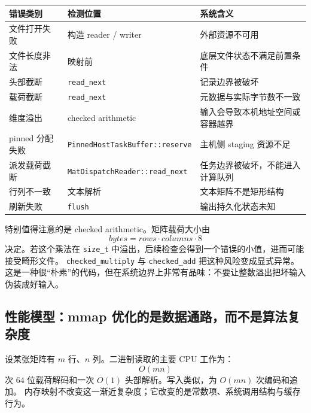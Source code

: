 \begin{table}[htbp]
    \centering
    \begin{tabular}{lll}
        \toprule
        错误类别        & 检测位置                                   & 系统含义             \\
        \midrule
        文件打开失败      & 构造 reader / writer                     & 外部资源不可用          \\
        文件长度非法      & 映射前                                    & 底层文件状态不满足前置条件    \\
        头部截断        & \texttt{read\_next}                    & 记录边界被破坏          \\
        载荷截断        & \texttt{read\_next}                    & 元数据与实际字节数不一致     \\
        维度溢出        & checked arithmetic                     & 输入会导致本机地址空间或容器越界 \\
        pinned 分配失败 & \texttt{PinnedHostTaskBuffer::reserve} & 主机侧 staging 资源不足 \\
        派发载荷截断      & \texttt{MatDispatchReader::read\_next} & 任务边界被破坏，不能进入计算队列 \\
        行列不一致       & 文本解析                                   & 文本矩阵不是矩形结构       \\
        刷新失败        & \texttt{flush}                         & 输出持久化状态未知        \\
        \bottomrule
    \end{tabular}
\end{table}

特别值得注意的是 checked arithmetic。矩阵载荷大小由
\[
    bytes = rows\cdot columns\cdot 8
\]
决定。若这个乘法在 \texttt{size\_t} 中溢出，后续检查会得到一个错误的小值，进而可能接受畸形文件。
\texttt{checked\_multiply} 与 \texttt{checked\_add} 把这种风险变成显式异常。
这是一种很“朴素”的代码，但在系统边界上非常有品味：不要让整数溢出把坏输入伪装成好输入。

\subsection{性能模型：mmap 优化的是数据通路，而不是算法复杂度}

设某张矩阵有 $m$ 行、$n$ 列。二进制读取的主要 CPU 工作为：
\[
    O(mn)
\]
次 $64$ 位载荷解码和一次 $O(1)$ 头部解析。写入类似，为 $O(mn)$ 次编码和追加。
内存映射不改变这一渐近复杂度；它改变的是常数项、系统调用结构与缓存行为。


